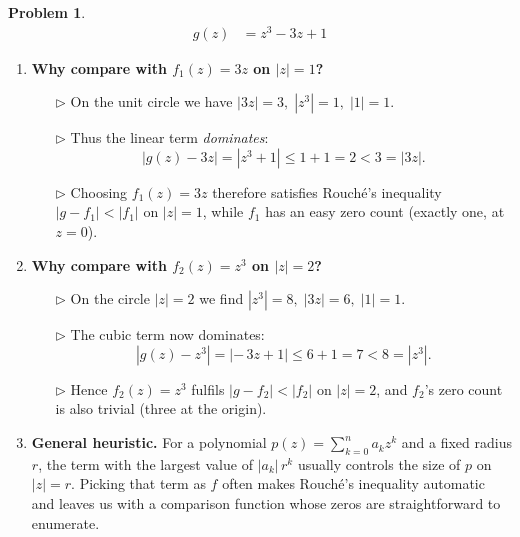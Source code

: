 \documentclass[12pt]{article}
\theoremstyle{definition} %
\newtheorem{problem}{Problem}
\theoremstyle{plain} %
\begin{document}
\begin{problem}
    \begin{align}
        g(z) &= z^{3}-3z+1
    \end{align}

    \begin{enumerate}

        \item \textbf{Why compare with $f_{1}(z)=3z$ on $|z|=1$?}

              \begin{enumerate}
                  \item[$\triangleright$] On the unit circle we have
                        $|3z|=3,\;|z^{3}|=1,\;|1|=1$.
                  \item[$\triangleright$] Thus the linear term \emph{dominates}:
                        \[
                            |g(z)-3z|
                            =|z^{3}+1|
                            \le 1+1=2 < 3 = |3z|.
                        \]
                  \item[$\triangleright$] Choosing $f_{1}(z)=3z$ therefore
                        satisfies Rouché’s inequality
                        $|g-f_{1}|<|f_{1}|$ on $|z|=1$, while $f_{1}$ has an
                        easy zero count (exactly one, at $z=0$).
              \end{enumerate}

        \item \textbf{Why compare with $f_{2}(z)=z^{3}$ on $|z|=2$?}

              \begin{enumerate}
                  \item[$\triangleright$] On the circle $|z|=2$ we find
                        $|z^{3}|=8,\;|3z|=6,\;|1|=1$.
                  \item[$\triangleright$] The cubic term now dominates:
                        \[
                            |g(z)-z^{3}|
                            =|{-}\,3z+1|
                            \le 6+1 = 7 < 8 = |z^{3}|.
                        \]
                  \item[$\triangleright$] Hence $f_{2}(z)=z^{3}$ fulfils
                        $|g-f_{2}|<|f_{2}|$ on $|z|=2$, and $f_{2}$’s zero
                        count is also trivial (three at the origin).
              \end{enumerate}

        \item \textbf{General heuristic.}
              For a polynomial $p(z)=\sum_{k=0}^{n}a_{k}z^{k}$ and a fixed
              radius $r$, the term with the largest value of $|a_{k}|\,r^{k}$
              usually controls the size of $p$ on $|z|=r$.  Picking that term
              as $f$ often makes Rouché’s inequality automatic and leaves us
              with a comparison function whose zeros are straightforward to
              enumerate.
    \end{enumerate}
\end{problem}
\end{document}
